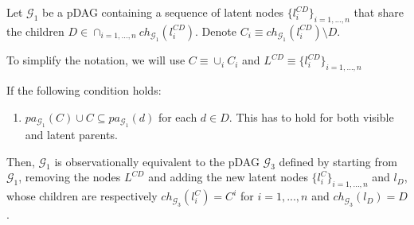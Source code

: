 \begin{proposition}
 \label{prop_strong_FS_DAG}
 Let $\mathcal{G}_1$ be a pDAG containing a sequence of latent nodes $\{l^{CD}_i\}_{i=1,...,n}$ that share the children $D\in \cap_{i=1,...,n} ch_{\mathcal{G}_1}(l^{CD}_i)$. Denote $C_i\equiv ch_{\mathcal{G}_1}(l^{CD}_i)\setminus D$.
 
 To simplify the notation, we will use $C\equiv \cup_i C_i$ and $L^{CD}\equiv \{l^{CD}_i\}_{i=1,...,n}$  
 
 If the following condition holds:
\begin{enumerate}
    \item $pa_{\mathcal{G}_1}(C)\cup C\subseteq pa_{\mathcal{G}_1}(d)$ for each $d \in D$. This has to hold for both visible and latent parents.
\end{enumerate}

Then,  ${\mathcal{G}_1}$ is observationally equivalent to the pDAG  ${\mathcal{G}_3}$ defined by starting from ${\mathcal{G}_1}$, removing the nodes $L^{CD}$ and adding the new latent nodes $\{l^{C}_i\}_{i=1,...,n}$ and $l_{D}$, whose children are respectively $ch_{\mathcal{G}_3}(l^{C}_i)=C^i$ for $i=1,...,n$ and  $ch_{\mathcal{G}_3}(l_D)=D$.
\end{proposition}
